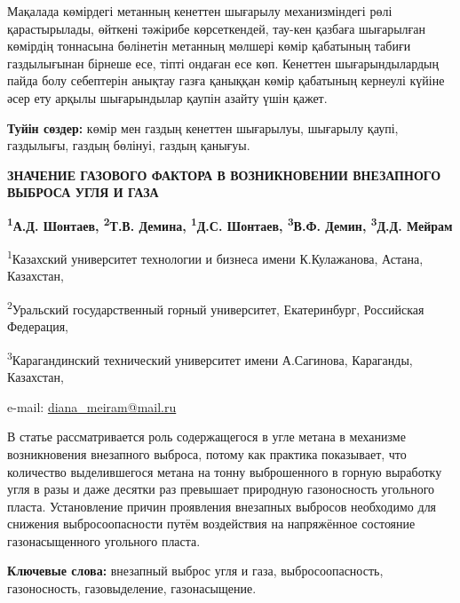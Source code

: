 Мақалада көмірдегі метанның кенеттен шығарылу механизміндегі рөлі
қарастырылады, өйткені тәжірибе көрсеткендей, тау-кен қазбаға шығарылған
көмірдің тоннасына бөлінетін метанның мөлшері көмір қабатының табиғи
газдылығынан бірнеше есе, тіпті ондаған есе көп. Кенеттен
шығарындылардың пайда болу себептерін анықтау газға қаныққан көмір
қабатының кернеулі күйіне әсер ету арқылы шығарындылар қаупін азайту
үшін қажет.

{\bfseries Туйін сөздер:} көмір мен газдың кенеттен шығарылуы, шығарылу
қаупі, газдылығы, газдың бөлінуі, газдың қанығуы.

\begin{articleheader}
{\bfseries ЗНАЧЕНИЕ ГАЗОВОГО ФАКТОРА В ВОЗНИКНОВЕНИИ ВНЕЗАПНОГО ВЫБРОСА УГЛЯ И ГАЗА}

{\bfseries
\textsuperscript{1}А.Д. Шонтаев,
\textsuperscript{2}Т.В. Демина,
\textsuperscript{1}Д.С. Шонтаев,
\textsuperscript{3}В.Ф. Демин,
\textsuperscript{3}Д.Д. Мейрам\textsuperscript{\envelope }
}
\end{articleheader}

\begin{affiliation}
\textsuperscript{1}Казахский университет технологии и бизнеса имени К.Кулажанова, Астана, Казахстан,

\textsuperscript{2}Уральский государственный горный университет, Екатеринбург, Российская Федерация,

\textsuperscript{3}Карагандинский технический университет имени А.Сагинова, Караганды, Казахстан,

e-mail: \href{mailto:baiz76@mail.ru}{diana\_meiram@mail.ru}
\end{affiliation}

В статье рассматривается роль содержащегося в угле метана в механизме
возникновения внезапного выброса, потому как практика показывает, что
количество выделившегося метана на тонну выброшенного в горную выработку
угля в разы и даже десятки раз превышает природную газоносность
угольного пласта. Установление причин проявления внезапных выбросов
необходимо для снижения выбросоопасности путём воздействия на
напряжённое состояние газонасыщенного угольного пласта.

{\bfseries Ключевые слова:} внезапный выброс угля и газа, выбросоопасность,
газоносность, газовыделение, газонасыщение.

